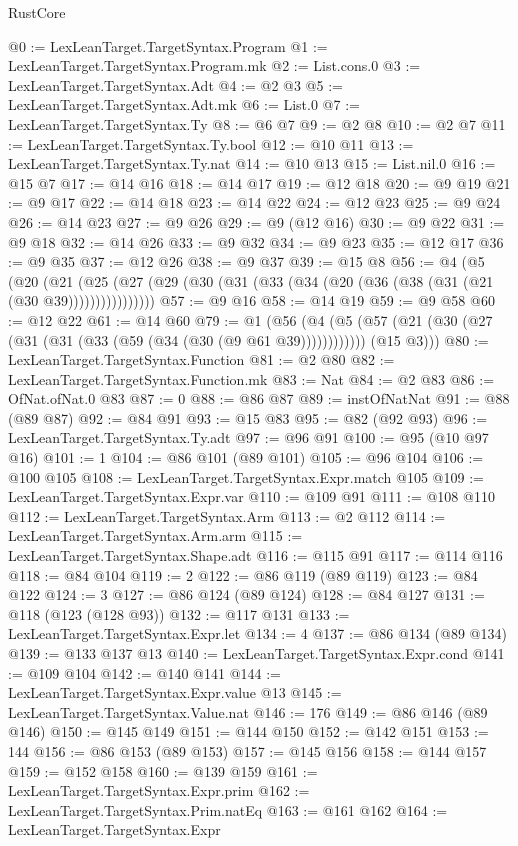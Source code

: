 \begin{lexlean}{RustCore}
\begin{coremodule}
@0 := LexLeanTarget.TargetSyntax.Program
@1 := LexLeanTarget.TargetSyntax.Program.mk
@2 := List.cons.{0}
@3 := LexLeanTarget.TargetSyntax.Adt
@4 := @2 @3
@5 := LexLeanTarget.TargetSyntax.Adt.mk
@6 := List.{0}
@7 := LexLeanTarget.TargetSyntax.Ty
@8 := @6 @7
@9 := @2 @8
@10 := @2 @7
@11 := LexLeanTarget.TargetSyntax.Ty.bool
@12 := @10 @11
@13 := LexLeanTarget.TargetSyntax.Ty.nat
@14 := @10 @13
@15 := List.nil.{0}
@16 := @15 @7
@17 := @14 @16
@18 := @14 @17
@19 := @12 @18
@20 := @9 @19
@21 := @9 @17
@22 := @14 @18
@23 := @14 @22
@24 := @12 @23
@25 := @9 @24
@26 := @14 @23
@27 := @9 @26
@29 := @9 (@12 @16)
@30 := @9 @22
@31 := @9 @18
@32 := @14 @26
@33 := @9 @32
@34 := @9 @23
@35 := @12 @17
@36 := @9 @35
@37 := @12 @26
@38 := @9 @37
@39 := @15 @8
@56 := @4
    (@5
      (@20 (@21 (@25 (@27 (@29 (@30 (@31 (@33 (@34 (@20 (@36 (@38 (@31 (@21 (@30 @39))))))))))))))))
@57 := @9 @16
@58 := @14 @19
@59 := @9 @58
@60 := @12 @22
@61 := @14 @60
@79 := @1
    (@56
      (@4 (@5 (@57 (@21 (@30 (@27 (@31 (@31 (@33 (@59 (@34 (@30 (@9 @61 @39)))))))))))) (@15 @3)))
@80 := LexLeanTarget.TargetSyntax.Function
@81 := @2 @80
@82 := LexLeanTarget.TargetSyntax.Function.mk
@83 := Nat
@84 := @2 @83
@86 := OfNat.ofNat.{0} @83
@87 := 0
@88 := @86 @87
@89 := instOfNatNat
@91 := @88 (@89 @87)
@92 := @84 @91
@93 := @15 @83
@95 := @82 (@92 @93)
@96 := LexLeanTarget.TargetSyntax.Ty.adt
@97 := @96 @91
@100 := @95 (@10 @97 @16)
@101 := 1
@104 := @86 @101 (@89 @101)
@105 := @96 @104
@106 := @100 @105
@108 := LexLeanTarget.TargetSyntax.Expr.match @105
@109 := LexLeanTarget.TargetSyntax.Expr.var
@110 := @109 @91
@111 := @108 @110
@112 := LexLeanTarget.TargetSyntax.Arm
@113 := @2 @112
@114 := LexLeanTarget.TargetSyntax.Arm.arm
@115 := LexLeanTarget.TargetSyntax.Shape.adt
@116 := @115 @91
@117 := @114 @116
@118 := @84 @104
@119 := 2
@122 := @86 @119 (@89 @119)
@123 := @84 @122
@124 := 3
@127 := @86 @124 (@89 @124)
@128 := @84 @127
@131 := @118 (@123 (@128 @93))
@132 := @117 @131
@133 := LexLeanTarget.TargetSyntax.Expr.let
@134 := 4
@137 := @86 @134 (@89 @134)
@139 := @133 @137 @13
@140 := LexLeanTarget.TargetSyntax.Expr.cond
@141 := @109 @104
@142 := @140 @141
@144 := LexLeanTarget.TargetSyntax.Expr.value @13
@145 := LexLeanTarget.TargetSyntax.Value.nat
@146 := 176
@149 := @86 @146 (@89 @146)
@150 := @145 @149
@151 := @144 @150
@152 := @142 @151
@153 := 144
@156 := @86 @153 (@89 @153)
@157 := @145 @156
@158 := @144 @157
@159 := @152 @158
@160 := @139 @159
@161 := LexLeanTarget.TargetSyntax.Expr.prim
@162 := LexLeanTarget.TargetSyntax.Prim.natEq
@163 := @161 @162
@164 := LexLeanTarget.TargetSyntax.Expr

\end{coremodule}
\end{lexlean}
